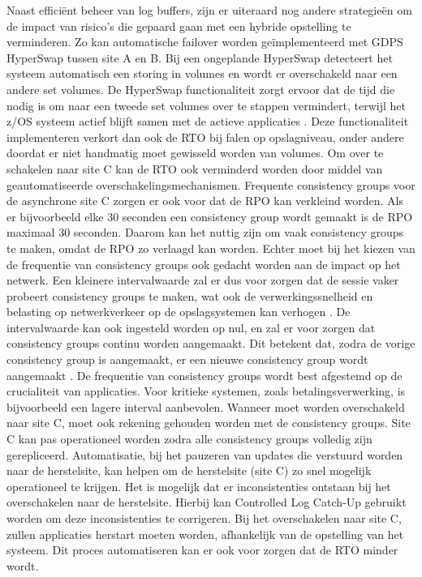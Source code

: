 Naast efficiënt beheer van log buffers, zijn er uiteraard nog andere strategieën om de impact van risico's die gepaard gaan met een hybride opstelling te verminderen.
Zo kan automatische failover worden geïmplementeerd met GDPS HyperSwap tussen site A en B.
Bij een ongeplande HyperSwap detecteert het systeem automatisch een storing in volumes en wordt er overschakeld naar een andere set volumes.
De HyperSwap functionaliteit zorgt ervoor dat de tijd die nodig is om naar een tweede set volumes over te stappen vermindert, terwijl het z/OS systeem actief blijft samen met de actieve applicaties \autocite{dhondy2005gdps}.
Deze functionaliteit implementeren verkort dan ook de RTO bij falen op opslagniveau, onder andere doordat er niet handmatig moet gewisseld worden van volumes.
Om over te schakelen naar site C kan de RTO ook verminderd worden door middel van geautomatiseerde overschakelingsmechanismen.
Frequente consistency groups voor de asynchrone site C zorgen er ook voor dat de RPO kan verkleind worden.
Als er bijvoorbeeld elke 30 seconden een consistency group wordt gemaakt is de RPO maximaal 30 seconden.
Daarom kan het nuttig zijn om vaak consistency groups te maken, omdat de RPO zo verlaagd kan worden.
Echter moet bij het kiezen van de frequentie van consistency groups ook gedacht worden aan de impact op het netwerk.
Een kleinere intervalwaarde zal er dus voor zorgen dat de sessie vaker probeert consistency groups te maken, wat ook de verwerkingssnelheid en belasting op netwerkverkeer op de opslagsystemen kan verhogen \autocite{ibm_2026_ibm_sessions_consistency_groups}.
De intervalwaarde kan ook ingesteld worden op nul, en zal er voor zorgen dat consistency groups continu worden aangemaakt.
Dit betekent dat, zodra de vorige consistency group is aangemaakt, er een nieuwe consistency group wordt aangemaakt \autocite{ibm_2023_ibm_mirror_global_consistency_groups}.
De frequentie van consistency groups wordt best afgestemd op de crucialiteit van applicaties.
Voor kritieke systemen, zoals betalingsverwerking, is bijvoorbeeld een lagere interval aanbevolen.
Wanneer moet worden overschakeld naar site C, moet ook rekening gehouden worden met de consistency groups.
Site C kan pas operationeel worden zodra alle consistency groups volledig zijn gerepliceerd.
Automatisatie, bij het pauzeren van updates die verstuurd worden naar de herstelsite, kan helpen om de herstelsite (site C) zo snel mogelijk operationeel te krijgen.
Het is mogelijk dat er inconsistenties ontstaan bij het overschakelen naar de herstelsite.
Hierbij kan Controlled Log Catch-Up gebruikt worden om deze inconsistenties te corrigeren.
Bij het overschakelen naar site C, zullen applicaties herstart moeten worden, afhankelijk van de opstelling van het systeem.
Dit proces automatiseren kan er ook voor zorgen dat de RTO minder wordt.

